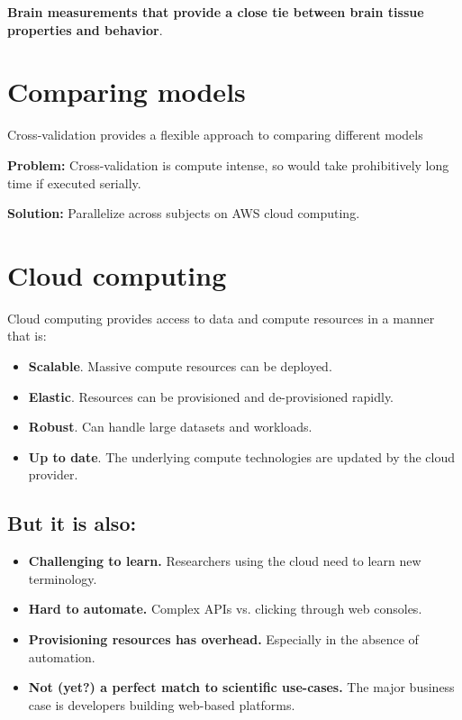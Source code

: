\documentclass[a0, landscape]{a0poster}
\begin{document}
\begin{multicols}{3}
\noindent \textbf{Brain measurements that provide a close tie between brain tissue properties and behavior}.

\vfill
\columnbreak
\color{Navy}

\section*{Comparing models}

Cross-validation provides a flexible approach to comparing different models \cite{Rokem2015PLoS}

{\bf Problem: } Cross-validation is compute intense, so would take prohibitively long time if executed serially.

{\bf Solution: } Parallelize across subjects on AWS cloud computing.



\section*{Cloud computing}

Cloud computing provides access to data and compute resources in a manner that is:

\begin{itemize}
\item{{\bf Scalable}. Massive compute resources can be deployed.}
\item{{\bf Elastic}. Resources can be provisioned and de-provisioned rapidly.}
\item{{\bf Robust}. Can handle large datasets and workloads.}
\item{{\bf Up to date}. The underlying compute technologies are updated by the cloud provider.}
\end{itemize}

\subsection*{But it is also:}

\begin{itemize}
\item{{\bf Challenging to learn.} Researchers using the cloud need to learn new terminology.}
\item{{\bf Hard to automate.} Complex APIs vs. clicking through web consoles.}
\item{{\bf Provisioning resources has overhead.} Especially in the absence of automation.}
\item{{\bf Not (yet?) a perfect match to scientific use-cases.} The major business case is developers building web-based platforms.}
\end{itemize}


\end{multicols}
\end{document}
